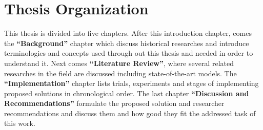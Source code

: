 




\section{Thesis Organization}

This thesis is divided into five chapters.
After this introduction chapter, comes the \textbf{``Background''} chapter
which discuss historical researches and introduce terminologies and concepts
used through out this thesis and needed in order to understand it.
Next comes \textbf{``Literature Review''},
where several related researches in the field are discussed including state-of-the-art models.
The \textbf{``Implementation''} chapter lists trials, experiments and stages of implementing proposed solutions in chronological order.
The last chapter \textbf{``Discussion and Recommendations''} formulate the proposed solution and researcher recommendations
and discuss them and how good they fit the addressed task of this work.

